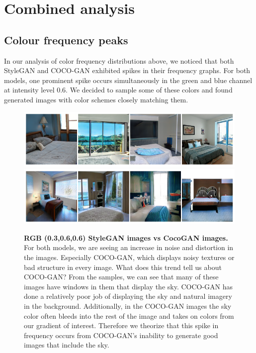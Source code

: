 \documentclass{article}
\begin{document}
        \section{Combined analysis}
        \label{sec:combinedAnalysis}
        
        \subsection{Colour frequency peaks}
        In our analysis of color frequency distributions above, we noticed that both StyleGAN and COCO-GAN exhibited spikes in their frequency graphs.
        For both models, one prominent spike occurs simultaneously in the green and blue channel at intensity level 0.6.
        We decided to sample some of these colors and found generated images with color schemes closely matching them.
        
        \begin{figure}[H]
          \centering
          \includegraphics[scale=0.28]{color-images/03_06_06_stylegan_images.png} 
          \includegraphics[scale=0.28]{color-images/03_06_06_coco_images.png}
          \caption{\textbf{RGB (0.3,0.6,0.6) StyleGAN images vs CocoGAN images.}
            For both models, we are seeing an increase in noise and distortion in the images.
            Especially COCO-GAN,  which displays noisy textures or bad structure in every image.
            What does this trend tell us about COCO-GAN?
            From the samples, we can see that many of these images have windows in them that display the sky.
            COCO-GAN has done a relatively poor job of displaying the sky and natural imagery in the background.
            Additionally, in the COCO-GAN images the sky color often bleeds into the rest of the image and takes on colors from our gradient of interest.
            Therefore we theorize that this spike in frequency occurs from COCO-GAN's inability to generate good images that include the sky.
        }
        \end{figure}
        
\end{document}
